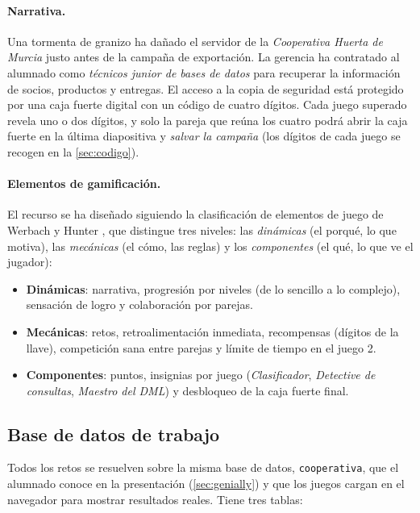 \documentclass[11pt,a4paper]{article}
\begin{document}
\paragraph{Narrativa.} Una tormenta de granizo ha dañado el servidor de la
\emph{Cooperativa Huerta de Murcia} justo antes de la campaña de exportación. La gerencia
ha contratado al alumnado como \emph{técnicos junior de bases de datos} para recuperar la
información de socios, productos y entregas. El acceso a la copia de seguridad está protegido
por una caja fuerte digital con un código de cuatro dígitos. Cada juego superado
revela uno o dos dígitos, y solo la pareja que reúna los cuatro
podrá abrir la caja fuerte en la última diapositiva y \textit{salvar la campaña}
(los dígitos de cada juego se recogen en la \autoref{sec:codigo}).

\paragraph{Elementos de gamificación.} El recurso se ha diseñado siguiendo la clasificación de
elementos de juego de Werbach y Hunter \cite{werbach2012}, que distingue tres niveles: las
\emph{dinámicas} (el porqué, lo que motiva), las \emph{mecánicas} (el cómo, las reglas) y los
\emph{componentes} (el qué, lo que ve el jugador):

\begin{itemize}
  \item \textbf{Dinámicas}: narrativa, progresión por niveles (de lo sencillo a lo complejo),
        sensación de logro y colaboración por parejas.
  \item \textbf{Mecánicas}: retos, retroalimentación inmediata, recompensas (dígitos
        de la llave), competición sana entre parejas y límite de tiempo en el juego 2.
  \item \textbf{Componentes}: puntos, insignias por juego (\textit{Clasificador},
        \textit{Detective de consultas}, \textit{Maestro del DML}) y desbloqueo
        de la caja fuerte final.
\end{itemize}

\subsection{Base de datos de trabajo}
\label{sec:bd}

Todos los retos se resuelven sobre la misma base de datos, \texttt{cooperativa}, que el
alumnado conoce en la presentación (\autoref{sec:genially}) y que los juegos cargan en el
navegador para mostrar resultados reales. Tiene tres
tablas:
\end{document}
